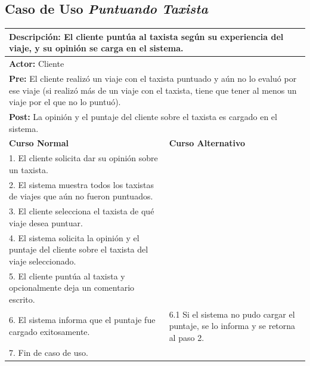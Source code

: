 \documentclass[a4paper]{article}
\begin{document}
\subsection{Caso de Uso \textit{Puntuando Taxista}}
\begin{center}
\begin{tabular}{|p{10cm} | p{6cm}|}
\hline
\multicolumn{2}{|p{16cm}|}{\textbf{Descripci\'on:} El cliente punt\'ua al taxista seg\'un su experiencia del viaje, y su opini\'on se carga en el sistema.} \\
\hline
\multicolumn{2}{|l|}{\textbf{Actor:} Cliente } \\
\hline
\multicolumn{2}{|p{15.5cm}|}{\textbf{Pre:} El cliente realiz\'o un viaje con el taxista puntuado y a\'un no lo evalu\'o por ese viaje (si realiz\'o m\'as de un viaje con el taxista, tiene que tener al menos un viaje por el que no lo puntu\'o). } \\
\hline
\multicolumn{2}{|p{14cm}|}{\textbf{Post:} La opini\'on y el puntaje del cliente sobre el taxista es cargado en el sistema. }\\
\hline
\textbf{Curso Normal}  & \textbf{Curso Alternativo} \\ \hline
1. El cliente solicita dar su opini\'on sobre un taxista. & \\ \hline
2. El sistema muestra todos los taxistas de viajes que a\'un no fueron puntuados. & \\ \hline
3. El cliente selecciona el taxista de qu\'e viaje desea puntuar. & \\ \hline
4. El sistema solicita la opini\'on y el puntaje del cliente sobre el taxista del viaje seleccionado. & \\ \hline
5. El cliente punt\'ua al taxista y opcionalmente deja un comentario escrito. & \\ \hline
6. El sistema informa que el puntaje fue cargado exitosamente. & 6.1 Si el sistema no pudo cargar el puntaje, se lo informa y se retorna al paso 2.\\ \hline
7. Fin de caso de uso. & \\ \hline


\end{tabular}
\end{center}
\end{document}
